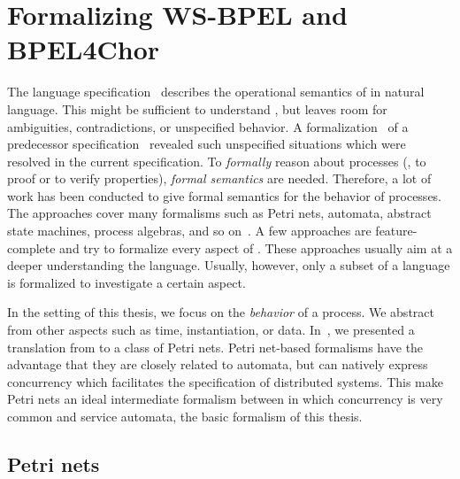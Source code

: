 \section[Formalizing WS-BPEL and BPEL4Chor]{Formalizing WS-BPEL and BPEL{\footnotesize 4}Chor}
\label{sec:Translation}

The  language specification~\cite{standard_bpel} describes the operational semantics of  in natural language. This might be sufficient to understand , but leaves room for ambiguities, contradictions, or unspecified behavior. A formalization~\cite{HinzSS_2005_bpm} of a predecessor specification~\cite{bpel4ws} revealed such unspecified situations which were resolved in the current specification. To \emph{formally} reason about  processes (\ie, to proof or to verify properties), \emph{formal semantics} are needed. Therefore, a lot of work has been conducted to give formal semantics for the behavior of  processes. The approaches cover many formalisms such as Petri nets, automata, abstract state machines, process algebras, and so on~\cite{BreugelK2006,LohmannVOSA_2009_ijbpim,LohmannVD_2008_topnoc}. A few  approaches are feature-complete and try to formalize every aspect of . These approaches usually aim at a deeper understanding the language. Usually, however, only a subset of a language is formalized to investigate a certain aspect.

In the setting of this thesis, we focus on the \emph{behavior} of a  process. We abstract from other aspects such as time, instantiation, or data. In~\cite{Lohmann_2007_wsfm,Lohmann_2007_hubtr212}, we presented a translation from  to a class of Petri nets. Petri net-based formalisms have the advantage that they are closely related to automata, but can natively express concurrency which facilitates the specification of distributed systems. This make Petri nets an ideal intermediate formalism between  in which concurrency is very common and service automata, the basic formalism of this thesis.




\subsection*{Petri nets}

